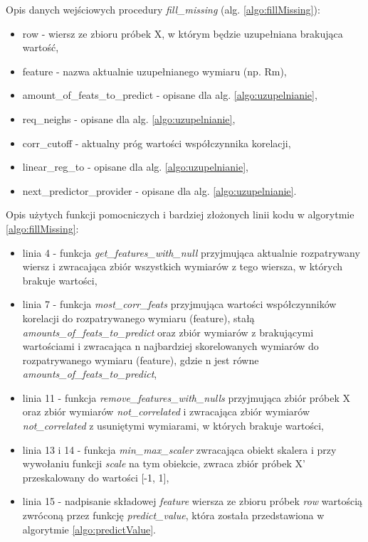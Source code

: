 \FloatBarrier

Opis danych wejściowych procedury \textit{fill\_missing} (alg. \ref{algo:fillMissing}):
\begin{itemize}
    \item row - wiersz ze zbioru próbek X, w którym będzie uzupełniana brakująca wartość,
    \item feature - nazwa aktualnie uzupełnianego wymiaru (np. Rm),
    \item amount\_of\_feats\_to\_predict - opisane dla alg. \ref{algo:uzupelnianie},
    \item req\_neighs - opisane dla alg. \ref{algo:uzupelnianie},
    \item corr\_cutoff - aktualny próg wartości współczynnika korelacji,
    \item linear\_reg\_to - opisane dla alg. \ref{algo:uzupelnianie},
    \item next\_predictor\_provider - opisane dla alg. \ref{algo:uzupelnianie}.
\end{itemize}

Opis użytych funkcji pomocniczych i bardziej złożonych linii kodu w algorytmie \ref{algo:fillMissing}:
\begin{itemize}
    \item linia 4 - funkcja \textit{get\_features\_with\_null} przyjmująca aktualnie rozpatrywany wiersz i zwracająca zbiór wszystkich wymiarów z tego wiersza, w których brakuje wartości,
    \item linia 7 - funkcja \textit{most\_corr\_feats} przyjmująca wartości współczynników korelacji do rozpatrywanego wymiaru (feature), stałą \textit{amounts\_of\_feats\_to\_predict} oraz zbiór wymiarów z brakującymi wartościami i zwracająca n najbardziej skorelowanych wymiarów do rozpatrywanego wymiaru (feature), gdzie n jest równe \textit{amounts\_of\_feats\_to\_predict},
    \item linia 11 - funkcja \textit{remove\_features\_with\_nulls} przyjmująca zbiór próbek X oraz zbiór wymiarów \textit{not\_correlated} i zwracająca zbiór wymiarów \textit{not\_correlated} z usuniętymi wymiarami, w których brakuje wartości,
    \item linia 13 i 14 - funkcja \textit{min\_max\_scaler} zwracająca obiekt skalera i przy wywołaniu funkcji \textit{scale} na tym obiekcie, zwraca zbiór próbek X' przeskalowany do wartości [-1, 1],
    \item linia 15 - nadpisanie składowej \textit{feature} wiersza ze zbioru próbek \textit{row} wartością zwróconą przez funkcję \textit{predict\_value}, która została przedstawiona w algorytmie \ref{algo:predictValue}.
\end{itemize}


